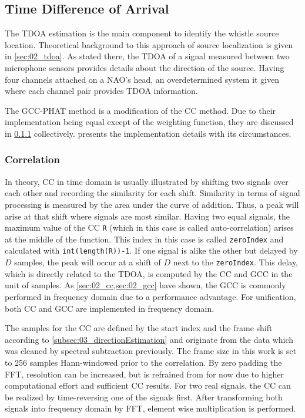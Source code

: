 \subsection{Time Difference of Arrival}
\label{subsec:03_tdoa}

The \ac{TDOA} estimation is the main component to identify the
whistle source location.
Theoretical background to this approach of source localization is
given in \cref{sec:02_tdoa}.
As stated there, the \ac{TDOA} of a signal measured between two microphone sensors
provides details about the direction of the source.
Having four channels attached on a NAO's head, an overdetermined system it
given where each channel pair provides \ac{TDOA} information.

The \ac{GCC-PHAT} method is a modification of the \ac{CC} method.
Due to their implementation being equal except of the weighting function,
they are discussed in \cref{subsubsec:03_cc} collectively.
 presents the implementation details with its
circumstances.

\subsubsection{Correlation}
\label{subsubsec:03_cc}

In theory, \acf{CC} in time domain is usually illustrated by shifting
two signals over each other and recording the similarity for each shift.
Similarity in terms of signal processing is measured by the area under the curve of addition.
Thus, a peak will arise at that shift where signals are most similar.
Having two equal signals, the maximum value of the \ac{CC} \lstinline!R! (which in this case
is called auto-correlation) arises at the middle of the function.
This index in this case is called \lstinline!zeroIndex! and calculated with
\lstinline!int(length(R))-1!.
If one signal is alike the other but delayed by $D$ samples, the peak will
occur at a shift of $D$ next to the \lstinline!zeroIndex!.
This delay, which is directly related to the \ac{TDOA}, is computed
by the \ac{CC} and \ac{GCC} in the unit of samples.
As \cref{sec:02_cc,sec:02_gcc} have shown, the \ac{GCC} is commonly performed
in frequency domain due to a performance advantage.
For unification, both \ac{CC} and \ac{GCC} are implemented in frequency domain.

The samples for the \ac{CC} are defined by the start index and the frame shift
according to \cref{subsec:03_directionEstimation} and originate from the data which was
cleaned by spectral subtraction previously.
The frame size in this work is set to 256 samples Hann-windowed prior to the correlation.
By zero padding the \ac{FFT}, resolution can be increased, but is refrained from for now
due to higher computational effort and sufficient \ac{CC} results.
For two real signals, the \ac{CC} can be realized by time-reversing one of the signals first.
After transforming both signals into frequency domain by \ac{FFT}, element wise multiplication is performed.

